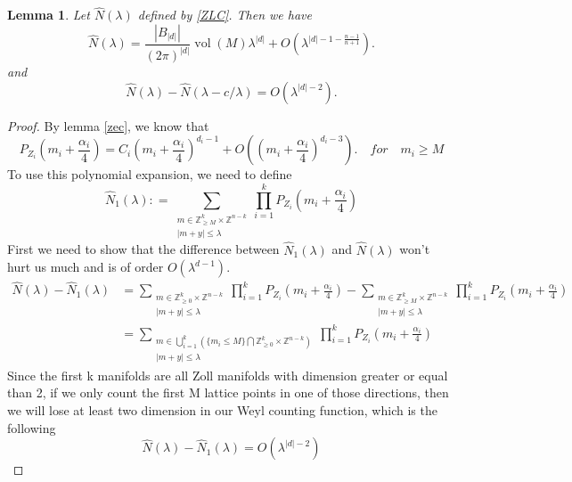 \documentclass[10pt]{amsart}
\newtheorem{lemma}[theorem]{Lemma}
\newcommand{\1}{\mathbb{1}}
\newcommand{\vol}{\operatorname{vol}}
\newcommand{\Z}{{\mathbb Z}}
\begin{document}
\begin{lemma}\label{ZollLatticeCount}
    Let $\hat{N}(\lambda)$ defined by \eqref{ZLC}. Then we have 
    \begin{equation}
        \hat{N}(\lambda) = \frac{|B_{|d|}|}{(2\pi)^{|d|}} \vol(M) \lambda^{|d|} + O(\lambda^{|d|-1-\frac{n-1}{n+1}}).
    \end{equation}
    and 
    \begin{equation}
        \hat{N}(\lambda) -\hat{N}(\lambda- c/\lambda) = O (\lambda^{|d|-2}).
    \end{equation}
\end{lemma}
\begin{proof}
    By lemma \ref{zec}, we know that 
    \begin{equation}
        P_{Z_i}(m_i+\frac{\alpha_i}{4}) = C_i (m_i+\frac{\alpha_i}{4})^{d_i-1} + O ((m_i+\frac{\alpha_i}{4})^{d_i-3}). \quad for \quad m_i \ge M
    \end{equation}
    To use this polynomial expansion, we need to define 
    \begin{equation}
        \hat{N}_1(\lambda) : = \sum_{\substack{m \in \Z_{\geq M}^k \times \Z^{n-k} \\ |m+y| \le \lambda }} \prod_{i = 1}^k P_{Z_i} (m_i +\frac{\alpha_i}{4})
    \end{equation}
    First we need to show that the difference between $\hat{N}_1(\lambda)$ and $\hat{N}(\lambda)$ won't hurt us much and is of order $O(\lambda^{d-1})$.
    \begin{align*}
        \hat{N}(\lambda)-\hat{N}_1(\lambda) &= \sum_{\substack{m \in \Z_{\geq 0}^k \times \Z^{n-k} \\ |m+y| \le \lambda }} \prod_{i = 1}^k P_{Z_i} (m_i +\frac{\alpha_i}{4}) - \sum_{\substack{m \in \Z_{\geq M}^k \times \Z^{n-k} \\ |m+y| \le \lambda }} \prod_{i = 1}^k P_{Z_i} (m_i +\frac{\alpha_i}{4}) \\
        & = \sum_{\substack{m \in \bigcup_{i=1}^k(\{m_i \le M\}\bigcap\Z_{\geq 0}^k \times \Z^{n-k}) \\ |m+y| \le \lambda }} \prod_{i = 1}^k P_{Z_i} (m_i +\frac{\alpha_i}{4})
    \end{align*}
    Since the first k manifolds are all Zoll manifolds with dimension greater or equal than 2, if we only count the first M lattice points in one of those directions, then we will lose at least two dimension in our Weyl counting function, which is the following
    \[
    \hat{N}(\lambda)-\hat{N}_1(\lambda) = O(\lambda^{|d|-2})
\]
\end{proof}
\end{document}
